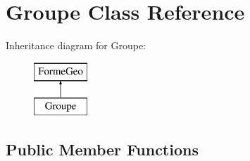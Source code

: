 \hypertarget{class_groupe}{}\section{Groupe Class Reference}
\label{class_groupe}
Inheritance diagram for Groupe\+:\begin{figure}[H]
\begin{center}
\leavevmode
\includegraphics[height=2.000000cm]{df/de3/class_groupe}
\end{center}
\end{figure}
\subsection*{Public Member Functions}
